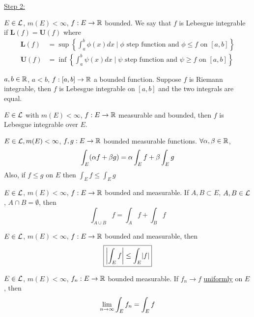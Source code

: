 \underline{Step 2:}

$E \in \mathcal{L}$, $m(E) < \infty$, $f: E \rightarrow \mathbb{R}$ bounded.
We say that $f$ is Lebesgue integrable if $\mathbf{L} (f) = \mathbf{U}(f)$ where
\begin{align*}
    \mathbf{L}(f) &= \sup \left\{ \int_{a}^{b} \phi (x) dx \mid \phi \text{ step function and } \phi \leq f \text{ on } [a,b] \right\} \\
    \mathbf{U} (f) &= \inf \left\{ \int_{a}^{b} \psi (x) dx \mid \psi \text{ step function and } \psi \geq f \text{ on } [a,b] \right\}
\end{align*}

\begin{theorem}
    $a,b \in \mathbb{R}$, $a < b$, $f: [a,b] \rightarrow \mathbb{R}$ a bounded function.
    Suppose $f$ is Riemann integrable, then $f$ is Lebesgue integrable on $[a,b]$ and the two integrals are equal.
\end{theorem}

\begin{theorem}
    $E \in \mathcal{L}$ with $m(E) < \infty$, $f: E \rightarrow \mathbb{R}$ measurable and bounded, then $f$ is Lebesgue integrable over $E$.
\end{theorem}

\begin{theorem}
    $E \in \mathcal{L}, m(E) < \infty$, $f,g: E \rightarrow \mathbb{R}$ bounded measurable functions.
    $\forall \alpha, \beta \in \mathbb{R}$,
    \[
        \int_{E} (\alpha f + \beta g) = \alpha \int_{E} f + \beta \int_{E} g
    \]
    Also, if $f \leq g$ on $E$ then $\int_{E} f \leq \int_{E} g$
\end{theorem}

\begin{corollary}[Chopping]
    $E \in \mathcal{L}$, $m(E) < \infty$, $f: E \rightarrow \mathbb{R}$ bounded and measurable.
    If $A, B \subset E$, $A, B \in \mathcal{L}$, $A \cap B = \emptyset$, then
    \[
        \boxed{ \int_{A \cup B} f = \int_{A}f + \int_{B} f}
    \]
\end{corollary}

\begin{prop}
    $E \in \mathcal{L}$, $m(E) < \infty$, $f: E \rightarrow \mathbb{R}$ bounded and measurable, then
    \[
        \boxed{ \left\lvert \int_{E} f \right\rvert \leq \int_{E} \lvert f\rvert}
    \]
\end{prop}

\begin{prop}
    $E \in \mathcal{L}$, $m(E) < \infty$, $f_n: E \rightarrow \mathbb{R}$ bounded measurable.
    If $f_n \rightarrow f$ \underline{uniformly} on $E$, then
    \[
        \lim_{n \rightarrow \infty} \int_{E} f_n = \int_{E} f
    \]
\end{prop}

